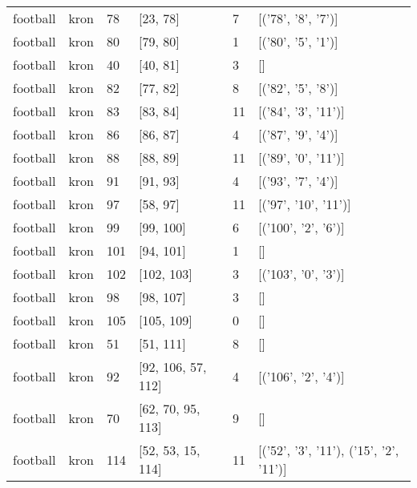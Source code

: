 \begin{tabular}{llllll}
football & kron & 78 & [23, 78] & 7 & [('78', '8', '7')] \\
football & kron & 80 & [79, 80] & 1 & [('80', '5', '1')] \\
football & kron & 40 & [40, 81] & 3 & [] \\
football & kron & 82 & [77, 82] & 8 & [('82', '5', '8')] \\
football & kron & 83 & [83, 84] & 11 & [('84', '3', '11')] \\
football & kron & 86 & [86, 87] & 4 & [('87', '9', '4')] \\
football & kron & 88 & [88, 89] & 11 & [('89', '0', '11')] \\
football & kron & 91 & [91, 93] & 4 & [('93', '7', '4')] \\
football & kron & 97 & [58, 97] & 11 & [('97', '10', '11')] \\
football & kron & 99 & [99, 100] & 6 & [('100', '2', '6')] \\
football & kron & 101 & [94, 101] & 1 & [] \\
football & kron & 102 & [102, 103] & 3 & [('103', '0', '3')] \\
football & kron & 98 & [98, 107] & 3 & [] \\
football & kron & 105 & [105, 109] & 0 & [] \\
football & kron & 51 & [51, 111] & 8 & [] \\
football & kron & 92 & [92, 106, 57, 112] & 4 & [('106', '2', '4')] \\
football & kron & 70 & [62, 70, 95, 113] & 9 & [] \\
football & kron & 114 & [52, 53, 15, 114] & 11 & [('52', '3', '11'), ('15', '2', '11')] \\
\bottomrule
\end{tabular}


